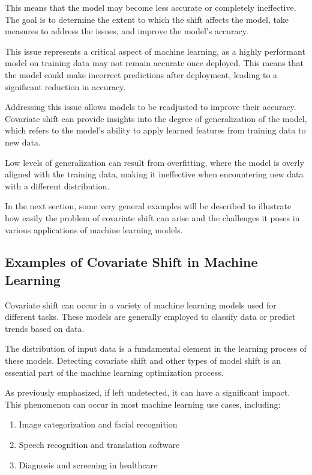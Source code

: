 This means that the model may become less accurate or completely ineffective. The goal is to determine the extent to which the shift affects the model, take measures to address the issues, and improve the model's accuracy.

This issue represents a critical aspect of machine learning, as a highly performant model on training data may not remain accurate once deployed. This means that the model could make incorrect predictions after deployment, leading to a significant reduction in accuracy.

Addressing this issue allows models to be readjusted to improve their accuracy. Covariate shift can provide insights into the degree of generalization of the model, which refers to the model's ability to apply learned features from training data to new data.

Low levels of generalization can result from overfitting, where the model is overly aligned with the training data, making it ineffective when encountering new data with a different distribution.  

In the next section, some very general examples will be described to illustrate how easily the problem of covariate shift can arise and the challenges it poses in various applications of machine learning models.


\subsection{Examples of Covariate Shift in Machine Learning}

Covariate shift can occur in a variety of machine learning models used for different tasks. These models are generally employed to classify data or predict trends based on data.
 
The distribution of input data is a fundamental element in the learning process of these models. Detecting covariate shift and other types of model shift is an essential part of the machine learning optimization process.

As previously emphasized, if left undetected, it can have a significant impact. This phenomenon can occur in most machine learning use cases, including:

\begin{enumerate}
    \item Image categorization and facial recognition
    \item Speech recognition and translation software
    \item Diagnosis and screening in healthcare
\end{enumerate}


